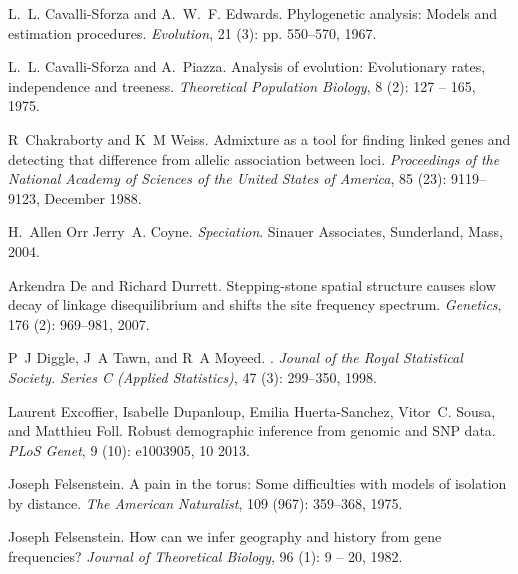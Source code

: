 \documentclass[10pt,letterpaper]{article}
\begin{document}
\begin{thebibliography}{80}
L.~L. Cavalli-Sforza and A.~W.~F. Edwards.
\newblock Phylogenetic analysis: Models and estimation procedures.
\newblock \emph{Evolution}, 21 (3): pp. 550--570, 1967.

L.~L. Cavalli-Sforza and A.~Piazza.
\newblock Analysis of evolution: Evolutionary rates, independence and treeness.
\newblock \emph{Theoretical Population Biology}, 8 (2): 127
  -- 165, 1975.

R~Chakraborty and K~M Weiss.
\newblock Admixture as a tool for finding linked genes and detecting that
  difference from allelic association between loci.
\newblock \emph{Proceedings of the National Academy of Sciences of the United
  States of America}, 85 (23): 9119--9123, December 1988.

H.~Allen Orr Jerry~A. Coyne.
\newblock \emph{Speciation}.
\newblock Sinauer Associates, Sunderland, Mass, 2004.

Arkendra De and Richard Durrett.
\newblock Stepping-stone spatial structure causes slow decay of linkage
  disequilibrium and shifts the site frequency spectrum.
\newblock \emph{Genetics}, 176 (2): 969--981, 2007.

P~J Diggle, J~A Tawn, and R~A Moyeed.
.
\newblock \emph{Jounal of the Royal Statistical Society. Series C (Applied
  Statistics)}, 47 (3): 299--350, 1998.

Laurent Excoffier, Isabelle Dupanloup, Emilia Huerta-Sanchez, Vitor~C. Sousa,
  and Matthieu Foll.
\newblock Robust demographic inference from genomic and {SNP} data.
\newblock \emph{PLoS Genet}, 9 (10): e1003905, 10 2013.

Joseph Felsenstein.
\newblock A pain in the torus: Some difficulties with models of isolation by
  distance.
\newblock \emph{The American Naturalist}, 109 (967):
  359--368, 1975.

Joseph Felsenstein.
\newblock How can we infer geography and history from gene frequencies?
\newblock \emph{Journal of Theoretical Biology}, 96 (1): 9 --
  20, 1982.


\end{thebibliography}
\end{document}

